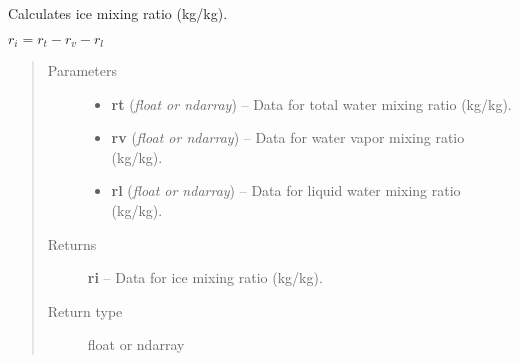 \documentclass[letterpaper,10pt,english]{sphinxmanual}
\begin{document}

\begin{fulllineitems}
\label{atmos:atmos.equations.ri_from_rt_rv_rl}
Calculates ice mixing ratio (kg/kg).

\(r_i = r_t-r_v-r_l\)
\begin{quote}\begin{description}
\item[{Parameters}] \leavevmode\begin{itemize}
\item {} 
\textbf{rt} (\emph{float or ndarray}) -- Data for total water mixing ratio (kg/kg).

\item {} 
\textbf{rv} (\emph{float or ndarray}) -- Data for water vapor mixing ratio (kg/kg).

\item {} 
\textbf{rl} (\emph{float or ndarray}) -- Data for liquid water mixing ratio (kg/kg).

\end{itemize}

\item[{Returns}] \leavevmode
\textbf{ri} --
Data for ice mixing ratio (kg/kg).

\item[{Return type}] \leavevmode
float or ndarray

\end{description}\end{quote}

\end{fulllineitems}

\end{document}
